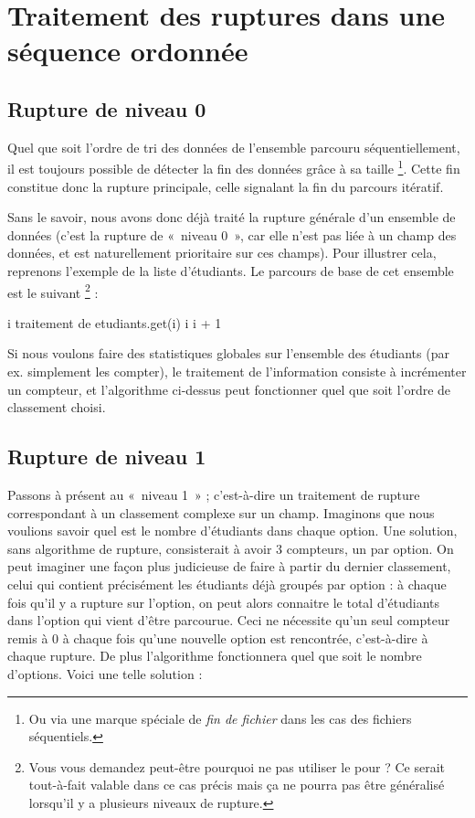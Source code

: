 \section{Traitement des ruptures dans une séquence ordonnée}

\subsection*{Rupture de niveau 0}

	Quel que soit l’ordre de tri des données de l'ensemble parcouru séquentiellement, 
	il est toujours possible de détecter la fin des données grâce à sa taille%
	\footnote{%
		Ou via une marque spéciale de \emph{fin de fichier}
		dans les cas des fichiers séquentiels.
	}.
	Cette \og{}fin\fg{} constitue donc la rupture principale, 
	celle signalant la fin du parcours itératif.
	
	Sans le savoir, nous avons donc déjà traité la rupture générale d’un
	ensemble de données (c’est la rupture de «~niveau 0~»,
	car elle n’est pas liée à un champ des données, 
	et est naturellement prioritaire sur ces champs). 
	Pour illustrer cela, reprenons l’exemple de la liste d’étudiants. 
	Le parcours de base de cet ensemble est le suivant%
	\footnote{%
		Vous vous demandez peut-être pourquoi ne pas utiliser le \og{}pour\fg{} ?
		Ce serait tout-à-fait valable dans ce cas précis mais ça ne pourra pas
		être généralisé lorsqu'il y a plusieurs niveaux de rupture.
	} :

	\begin{LDA}
			\Let i 
				\LComment traitement de etudiants.get(i)
				\Let i \Gets i + 1
			\EndWhile
		\EndAlgo
	\end{LDA}

	Si nous voulons faire des statistiques globales sur l’ensemble des
	étudiants (par ex. simplement les compter), le traitement de
	l’information consiste à incrémenter un compteur, et l’algorithme
	ci-dessus peut fonctionner quel que soit l’ordre de classement choisi.

\subsection*{Rupture de niveau 1}

	Passons à présent au «~niveau 1~» ; c’est-à-dire un traitement de
	rupture correspondant à un classement complexe sur un champ. 
	Imaginons que nous voulions savoir quel est le nombre d’étudiants dans chaque option. 
	Une solution, sans algorithme de rupture, consisterait à avoir 3 compteurs, un par option.
	On peut imaginer une façon plus judicieuse de faire à partir du dernier classement, celui
	qui contient précisément les étudiants déjà groupés par option : 
	à chaque fois qu’il y a rupture sur l’option, 
	on peut alors connaitre le total d’étudiants dans l’option qui vient d’être parcourue. 
	Ceci ne nécessite qu’un seul compteur remis à 0 à chaque fois qu’une nouvelle
	option est rencontrée, c’est-à-dire à chaque rupture. 
	De plus l’algorithme fonctionnera quel que soit le nombre d’options. 
	Voici une telle solution : 

